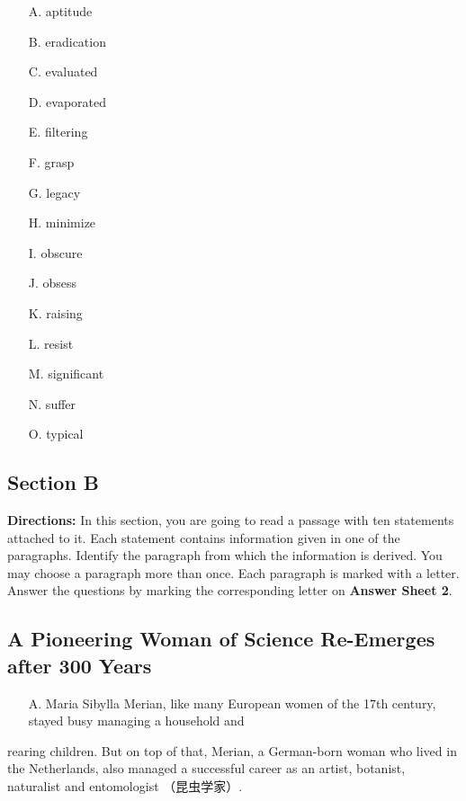 \documentclass[UTF8,11pt]{ctexart}
\begin{document}
\begin{itemize}[leftmargin=2em,itemsep=.2em,topsep=.4em]\item[A.] aptitude
\item[B.] eradication
\item[C.] evaluated
\item[D.] evaporated
\item[E.] filtering
\item[F.] grasp
\item[G.] legacy
\item[H.] minimize
\item[I.] obscure
\item[J.] obsess
\item[K.] raising
\item[L.] resist
\item[M.] significant
\item[N.] suffer
\item[O.] typical
\end{itemize}

\subsection*{\textbf{Section B}}


\textbf{Directions:} In this section, you are going to read a passage with ten statements attached to it. Each statement contains information given in one of the paragraphs. Identify the paragraph from which the information is derived. You may choose a paragraph more than once. Each paragraph is marked with a letter. Answer the questions by marking the corresponding letter on\textbf{ Answer Sheet 2}.


\subsection*{\textbf{A Pioneering Woman of Science Re-Emerges after 300 Years}}


\begin{itemize}[leftmargin=2em,itemsep=.2em,topsep=.4em]\item[A.] Maria Sibylla Merian, like many European women of the 17th century, stayed busy managing a household and
\end{itemize}

rearing children. But on top of that, Merian, a German-born woman who lived in the Netherlands, also managed a successful career as an artist, botanist, naturalist and entomologist （昆虫学家）.
\end{document}
